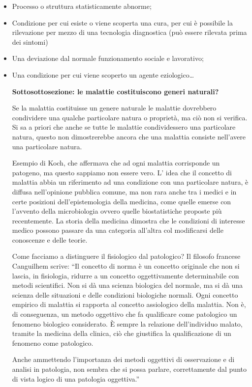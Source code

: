 \documentclass[]{article}
\begin{document}
\begin{itemize}
\item
  Processo o struttura statisticamente abnorme;
\item
  Condizione per cui esiste o viene scoperta una cura, per cui è
  possibile la rilevazione per mezzo di una tecnologia diagnostica (può
  essere rilevata prima dei sintomi)
\item
  Una deviazione dal normale funzionamento sociale e lavorativo;
\item
  Una condizione per cui viene scoperto un agente eziologico\ldots{}

  \textbf{Sottosottosezione: le malattie costituiscono generi naturali?}

  Se la malattia costituisse un genere naturale le malattie dovrebbero
  condividere una qualche particolare natura o proprietà, ma ciò non si
  verifica. Si sa a priori che anche se tutte le malattie condividessero
  una particolare natura, questo non dimostrerebbe ancora che una
  malattia consiste nell'avere una particolare natura.

  Esempio di Koch, che affermava che ad ogni malattia corrisponde un
  patogeno, ma questo sappiamo non essere vero. L' idea che il concetto
  di malattia abbia un riferimento ad una condizione con una particolare
  natura, è diffusa nell'opinione pubblica comune, ma non rara anche tra
  i medici e in certe posizioni dell'epistemologia della medicina, come
  quelle emerse con l'avvento della microbiologia ovvero quelle
  biostatistiche proposte più recentemente. La storia della medicina
  dimostra che le condizioni di interesse medico possono passare da una
  categoria all'altra col modificarsi delle conoscenze e delle teorie.

  Come facciamo a distinguere il fisiologico dal patologico? Il filosofo
  francese Canguilhem scrive: ``Il concetto di norma è un concetto
  originale che non si lascia, in fisiologia, ridurre a un concetto
  oggettivamente determinabile con metodi scientifici. Non si dà una
  scienza biologica del normale, ma si dà una scienza delle situazioni e
  delle condizioni biologiche normali. Ogni concetto empirico di
  malattia si rapporta al concetto assiologico della malattia. Non è, di
  conseguenza, un metodo oggettivo che fa qualificare come patologico un
  fenomeno biologico considerato. È sempre la relazione dell'individuo
  malato, tramite la medicina della clinica, ciò che giustifica la
  qualificazione di un fenomeno come patologico.

  Anche ammettendo l'importanza dei metodi oggettivi di osservazione e
  di analisi in patologia, non sembra che si possa parlare,
  correttamente dal punto di vista logico di una patologia oggettiva.''


\end{itemize}
\end{document}
